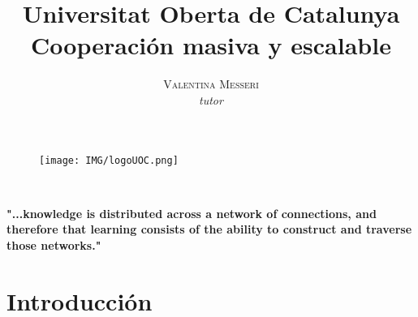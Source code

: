 \documentclass[11pt]{article}
\title{\textbf{Universitat Oberta de Catalunya }\\ %
\vspace{10pt}
{Cooperación masiva y escalable}}%
\author{\textsc{Valentina Messeri} %
\\{\textit{tutor}}} %
\date{} %
\makeatletter
\renewcommand{\maketitle} {%

\begin{center} %
{\LARGE\@title} %

\vspace{10pt} %

{\large\@author} %
\\\@date %

\vspace{10pt} %
\end{center}
}
\makeatother
\begin{document}
\textit{}
\begin{figure}[ht]\centering
\texttt{[image: IMG/logoUOC.png]}
\end{figure}

\maketitle %



\begin{abstract}

\end{abstract}

\vspace{20pt} %

\begin{center}
    \begin{minipage}{0.9\linewidth}
    \vspace{5pt}%
        \textbf{ "...knowledge is distributed across a network of connections, and therefore that learning consists of the ability to construct and traverse those networks."
        }
        \begin{flushright}
        \citep {Dow12}
        \end{flushright}
    \vspace{5pt}%
    \end{minipage}
\end{center}
\renewcommand*\contentsname{Index}
\thispagestyle{empty} %

\section{Introducción}
\end{document}
